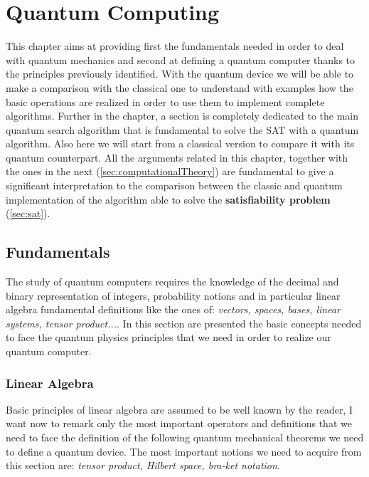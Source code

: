 \documentclass[english]{article}
\begin{document}
	\section{Quantum Computing}
	\label{sec:quantumComputing}
		This chapter aims at providing first the fundamentals needed in order to deal with quantum mechanics and second at defining a quantum computer thanks to the principles previously identified. With the quantum device we will be able to make a comparison with the classical one to understand with examples how the basic operations are realized in order to use them to implement complete algorithms. Further in the chapter, a section is completely dedicated to the main quantum search algorithm that is fundamental to solve the SAT with a quantum algorithm. Also here we will start from a classical version to compare it with its quantum counterpart. All the arguments related in this chapter, together with the ones in the next (\ref{sec:computationalTheory}) are fundamental to give a significant interpretation to the comparison between the classic and quantum implementation of the algorithm able to solve the \textbf{satisfiability problem} (\ref{sec:sat}).
		
		\subsection{Fundamentals}
		\label{sec:fundamentals}
			The study of quantum computers requires the knowledge of the decimal and binary representation of integers, probability notions and in particular linear algebra fundamental definitions like the ones of: \emph{vectors, spaces, bases, linear systems, tensor product...}. In this section are presented the basic concepts needed to face the quantum physics principles that we need in order to realize our quantum computer. 
			
			\subsubsection{Linear Algebra}
			\label{sec:linearAlgebra}
			Basic principles of linear algebra are assumed to be well known by the reader, I want now to remark only the most important operators and definitions that we need to face the definition of the following quantum mechanical theorems we need to define a quantum device. The most important notions we need to acquire from this section are: \emph{tensor product, Hilbert space, bra-ket notation}.\\
			
\end{document}

